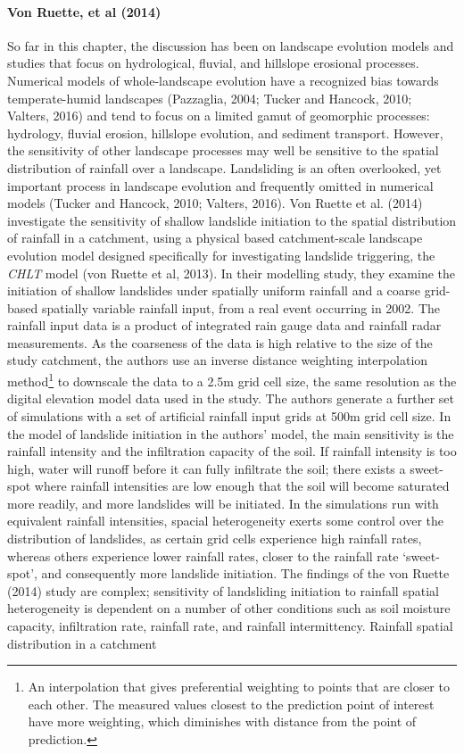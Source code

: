 \paragraph{Von Ruette, et al (2014)}

So far in this chapter, the discussion has been on landscape evolution models and studies that focus on hydrological, fluvial, and hillslope erosional processes. Numerical models of whole-landscape evolution have a recognized bias towards temperate-humid landscapes (Pazzaglia, 2004; Tucker and Hancock, 2010; Valters, 2016) and tend to focus on a limited gamut of geomorphic processes: hydrology, fluvial erosion, hillslope evolution, and sediment transport. However, the sensitivity of other landscape processes may well be sensitive to the spatial distribution of rainfall over a landscape. Landsliding is an often overlooked, yet important process in landscape evolution and frequently omitted in numerical models (Tucker and Hancock, 2010; Valters, 2016). Von Ruette et al. (2014) investigate the sensitivity of shallow landslide initiation to the spatial distribution of rainfall in a catchment, using a physical based catchment-scale landscape evolution model designed specifically for investigating landslide triggering, the \emph{CHLT} model (von Ruette et al, 2013). In their modelling study, they examine the initiation of shallow landslides under spatially uniform rainfall and a coarse grid-based spatially variable rainfall input, from a real event occurring in 2002. The rainfall input data is a product of integrated rain gauge data and rainfall radar measurements. As the coarseness of the data is high relative to the size of the study catchment, the authors use an inverse distance weighting interpolation method\footnote{An interpolation that gives preferential weighting to points that are closer to each other. The measured values closest to the prediction point of interest have more weighting, which diminishes with distance from the point of prediction.} to downscale the data to a 2.5m grid cell size, the same resolution as the digital elevation model data used in the study. The authors generate a further set of simulations with a set of artificial rainfall input grids at 500m grid cell size. In the model of landslide initiation in the authors' model, the main sensitivity is the rainfall intensity and the infiltration capacity of the soil. If rainfall intensity is too high, water will runoff before it can fully infiltrate the soil; there exists a sweet-spot where rainfall intensities are low enough that the soil will become saturated more readily, and more landslides will be initiated. In the simulations run with equivalent rainfall intensities, spacial heterogeneity exerts some control over the distribution of landslides, as certain grid cells experience high rainfall rates, whereas others experience lower rainfall rates, closer to the rainfall rate `sweet-spot', and consequently more landslide initiation. The findings of the von Ruette (2014) study are complex; sensitivity of landsliding initiation to rainfall spatial heterogeneity is dependent on a number of other conditions such as soil moisture capacity, infiltration rate, rainfall rate, and rainfall intermittency. Rainfall spatial distribution in a catchment 